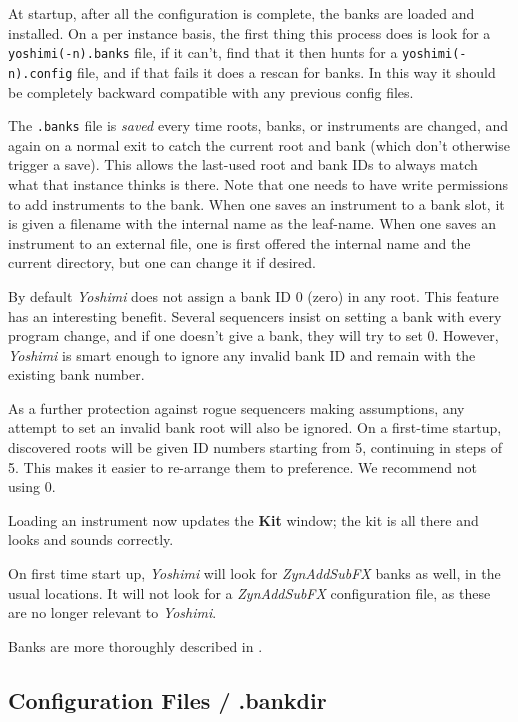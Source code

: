    At startup, after all the configuration is complete, the banks are loaded and
   installed.  On a per instance basis, the first thing this process does is
   look for a \texttt{yoshimi(-n).banks} file, if it can't, find that it then
   hunts for a \texttt{yoshimi(-n).config} file, and if that fails it does a
   rescan for banks. In this way it should be completely backward compatible
   with any previous config files.

   The \texttt{.banks} file is \textsl{saved} every time roots, banks, or
   instruments are changed, and again on a normal exit to catch the current
   root and bank (which don't otherwise trigger a save).  This allows the
   last-used root and bank IDs to always match what that instance thinks is
   there.  Note that one needs to have write permissions to add instruments to
   the bank.  When one saves an instrument to a bank slot, it is given a
   filename with the internal name as the leaf-name.  When one saves an
   instrument to an external file, one is  first offered the internal name
   and the current directory, but one can change it if desired.

   By default \textsl{Yoshimi} does not assign a bank ID 0 (zero) in any root.
   This feature has an interesting benefit. Several sequencers insist on
   setting a bank with every program change, and if one doesn't give a bank,
   they will try to set 0. However, \textsl{Yoshimi} is smart enough to ignore
   any invalid bank ID and remain with the existing bank number.

   As a further protection against rogue sequencers making assumptions, any
   attempt to set an invalid bank root will also be ignored.  On a
   first-time startup, discovered roots will be given ID numbers starting from 5,
   continuing in steps of 5. This makes it easier to re-arrange them to
   preference. We recommend not using 0.

   Loading an instrument now updates the \textbf{Kit} window;
   the kit is all there and looks and sounds correctly.

   On first time start up, \textsl{Yoshimi}
   will look for \textsl{ZynAddSubFX} banks as well, in the usual locations.
   It will not look for a \textsl{ZynAddSubFX} configuration file, as these
   are no longer relevant to \textsl{Yoshimi}.

   Banks are more thoroughly described in
   .

\subsection{Configuration Files / .bankdir}
\label{subsec:configuration_bankdir}

